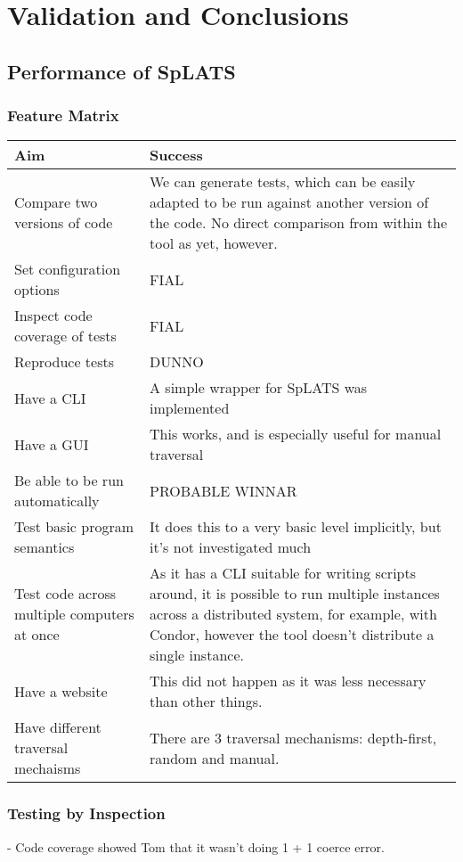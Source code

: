 \chapter{Validation and Conclusions}
\section{Performance of SpLATS}
  \subsection{Feature Matrix}
    \begin{tabular}{p{} | p{}}
    Aim & Success \\
    \hline
    Compare two versions of code &
    We can generate tests, which can be easily adapted to be run against another version of the code.
    No direct comparison from within the tool as yet, however. \\
    Set configuration options & FIAL \\
    Inspect code coverage of tests & FIAL \\
    Reproduce tests & DUNNO \\
    Have a CLI &
    A simple wrapper for SpLATS was implemented \\
    \hline
    Have a GUI &
    This works, and is especially useful for manual traversal \\
    Be able to be run automatically & PROBABLE WINNAR \\
    Test basic program semantics &
    It does this to a very basic level implicitly, but it's not investigated much \\
    Test code across multiple computers at once &
    As it has a CLI suitable for writing scripts around, it is possible to run multiple instances across a distributed system, for example, with Condor, however the tool doesn't distribute a single instance. \\
    \hline
    Have a website &
    This did not happen as it was less necessary than other things. \\
    Have different traversal mechaisms &
    There are 3 traversal mechanisms: depth-first, random and manual. \\
    \end{tabular}

  \subsection{Testing by Inspection}
  - Code coverage showed Tom that it wasn't doing 1 + 1 coerce error.
